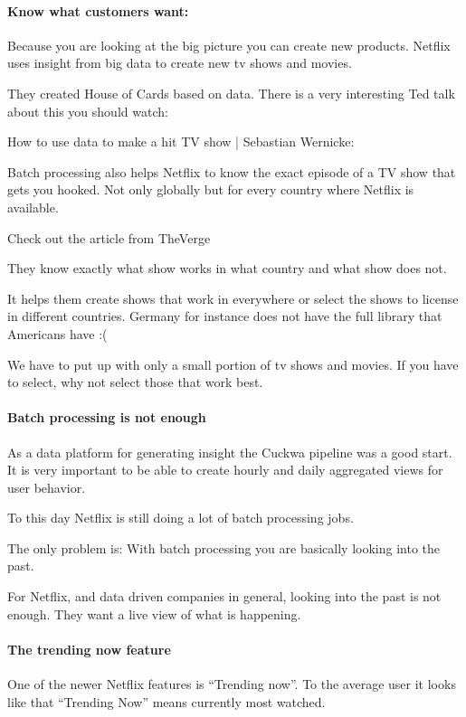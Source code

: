 \documentclass[12pt]{scrartcl} %
\begin{document}
\paragraph{Know what customers want:}

Because you are looking at the big picture you can create new products. Netflix uses insight from big data to create new tv shows and movies.

They created House of Cards based on data. There is a very interesting Ted talk about this you should watch:

How to use data to make a hit TV show | Sebastian Wernicke:


Batch processing also helps Netflix to know the exact episode of a TV show that gets you hooked. Not only globally but for every country where Netflix is available.

Check out the article from TheVerge

They know exactly what show works in what country and what show does not.

It helps them create shows that work in everywhere or select the shows to license in different countries. Germany for instance does not have the full library that Americans have :(

We have to put up with only a small portion of tv shows and movies. If you have to select, why not select those that work best.

\paragraph{Batch processing is not enough}

As a data platform for generating insight the Cuckwa pipeline was a good start. It is very important to be able to create hourly and daily aggregated views for user behavior.

To this day Netflix is still doing a lot of batch processing jobs.

The only problem is: With batch processing you are basically looking into the past.

For Netflix, and data driven companies in general, looking into the past is not enough. They want a live view of what is happening.

\paragraph{The trending now feature}
One of the newer Netflix features is “Trending now”. To the average user it looks like that “Trending Now” means currently most watched.
\end{document}
